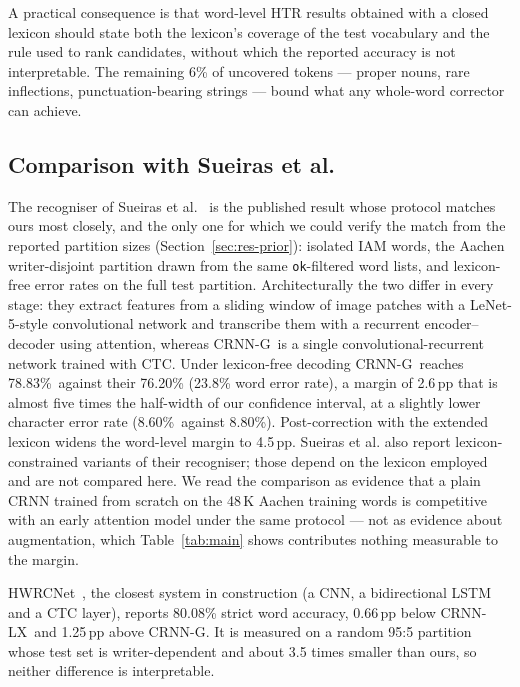 \documentclass[conference]{IEEEtran}
\newcommand{\ours}{CRNN-LX}            %
\newcommand{\oursnolm}{CRNN-G}         %
\newcommand{\rawwa}{78.83\%}
\newcommand{\rawcer}{8.60\%}
\begin{document}
A practical consequence is that word-level HTR results obtained with a
closed lexicon should state both the lexicon's coverage of the test
vocabulary and the rule used to rank candidates, without which the
reported accuracy is not interpretable. The remaining 6\% of uncovered tokens --- proper nouns,
rare inflections, punctuation-bearing strings --- bound what any
whole-word corrector can achieve.

\subsection{Comparison with Sueiras et al.}
\label{sec:disc-sueiras}

The recogniser of Sueiras et al.~\cite{sueiras2018offline} is the
published result whose protocol matches ours most closely, and the
only one for which we could verify the match from the reported
partition sizes (Section~\ref{sec:res-prior}): isolated IAM words, the
Aachen writer-disjoint partition drawn from the same
\texttt{ok}-filtered word lists, and lexicon-free error rates on the
full test partition. Architecturally the two differ in every stage: they extract features from a sliding window
of image patches with a LeNet-5-style convolutional network and
transcribe them with a recurrent encoder--decoder using attention,
whereas \oursnolm\ is a single convolutional-recurrent network trained
with CTC. Under lexicon-free decoding \oursnolm\ reaches \rawwa\
against their 76.20\% (23.8\% word error rate), a margin of 2.6\,pp
that is almost five times the half-width of our confidence interval,
at a slightly lower character error rate (\rawcer\ against 8.80\%).
Post-correction with the extended lexicon widens the word-level margin
to 4.5\,pp. Sueiras et al. also report lexicon-constrained variants of
their recogniser; those depend on the lexicon employed and are not
compared here. We read the comparison as evidence that a plain CRNN
trained from scratch on the 48\,K Aachen training words is competitive
with an early attention model under the same protocol --- not as
evidence about augmentation, which Table~\ref{tab:main} shows
contributes nothing measurable to the margin.

HWRCNet~\cite{rajesh2022hwrcnet}, the closest system in construction
(a CNN, a bidirectional LSTM and a CTC layer), reports 80.08\% strict
word accuracy, 0.66\,pp below \ours\ and 1.25\,pp above \oursnolm. It
is measured on a random 95:5 partition whose test set is
writer-dependent and about 3.5 times smaller than ours, so neither
difference is interpretable.
\end{document}
